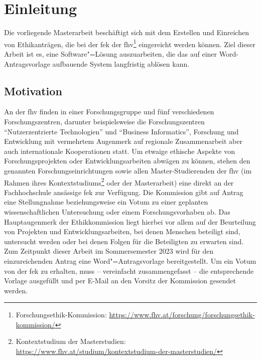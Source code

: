 \documentclass[a4paper,12pt,twoside,numbers=noendperiod]{scrreprt}
\begin{document}
\cleardoublepage
{}

\chapter{Einleitung}
\label{chap:einleitung}

Die vorliegende Masterarbeit beschäftigt sich mit dem Erstellen und Einreichen von Ethikanträgen, die bei der \ac{fek} der \ac{fhv}\footnote{Forschungsethik-Kommission: \url{https://www.fhv.at/forschung/forschungsethik-kommission/}} eingereicht werden können. Ziel dieser Arbeit ist es, eine Software"=Lösung auszuarbeiten, die das auf einer Word-Antragsvorlage aufbauende System langfristig ablösen kann.

\section{Motivation}
\label{sec:motivation}

An der \acl{fhv} finden in einer Forschungsgruppe und fünf verschiedenen Forschungszentren, darunter beispielsweise die Forschungszentren \enquote{Nutzerzentrierte Technologien} und \enquote{Business Informatics}, Forschung und Entwicklung mit vermehrtem Augenmerk auf regionale Zusammenarbeit aber auch internationale Kooperationen statt. \cite{fachhochschule_vorarlberg_gmbh_forschung_2021} Um etwaige ethische Aspekte von Forschungsprojekten oder Entwicklungsarbeiten abwägen zu können, stehen den genannten Forschungseinrichtungen sowie allen Master-Studierenden der \acl{fhv} (im Rahmen ihres Kontextstudiums\footnote{Kontextstudium der Masterstudien: \url{https://www.fhv.at/studium/kontextstudium-der-masterstudien/}} oder der Masterarbeit) eine direkt an der Fachhochschule ansässige \acl{fek} zur Verfügung. Die Kommission gibt auf Antrag eine Stellungnahme beziehungsweise ein Votum zu einer geplanten wissenschaftlichen Untersuchung oder einem Forschungsvorhaben ab. Das Hauptaugenmerk der Ethikkommission liegt hierbei vor allem auf der Beurteilung von Projekten und Entwicklungsarbeiten, bei denen Menschen beteiligt sind, untersucht werden oder bei denen Folgen für die Beteiligten zu erwarten sind. Zum Zeitpunkt dieser Arbeit im Sommersemester 2023 wird für den einzureichenden Antrag eine Word"=Antragsvorlage bereitgestellt. Um ein Votum von der \acl{fek} zu erhalten, muss -- vereinfacht zusammengefasst -- die entsprechende Vorlage ausgefüllt und per E-Mail an den Vorsitz der Kommission gesendet werden. \cite{fachhochschule_vorarlberg_gmbh_forschungsethik-kommission_2021}
\end{document}
